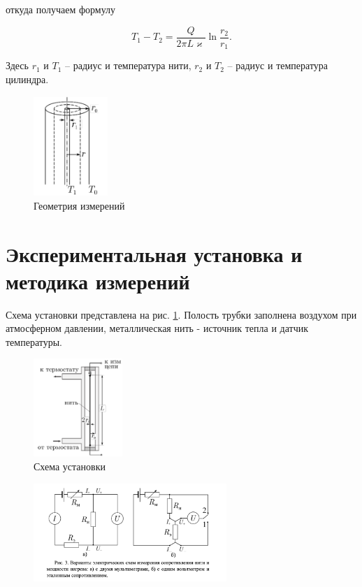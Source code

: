 \documentclass[a4paper,12pt]{article}
\begin{document}
откуда получаем формулу

\begin{equation}
	T_1 - T_2 = \frac{Q}{2\pi L\varkappa} \ln \frac{r_2}{r_1}.
\end{equation}

Здесь $r_1$ и $T_1$ -- радиус и температура нити, $r_2$ и $T_2$ -- радиус и температура цилиндра.

\begin{figure}[H]
    \centering
    \includegraphics[width=0.25\textwidth]{first.png}
    \caption{Геометрия измерений}
\end{figure}

\section{Экспериментальная установка и методика измерений}

Схема установки представлена на рис. \ref{схема}. Полость трубки заполнена воздухом при атмосферном давлении, металлическая нить - источник тепла и датчик температуры.
\begin{figure}[H]
    \centering
    \includegraphics[width=0.3\textwidth]{схема.png}
\caption{Схема установки} \label{схема}
\end{figure}

\begin{figure}[H]
\centering
    \includegraphics[width=0.65\textwidth]{электричество.png}
\end{figure}
\end{document}
